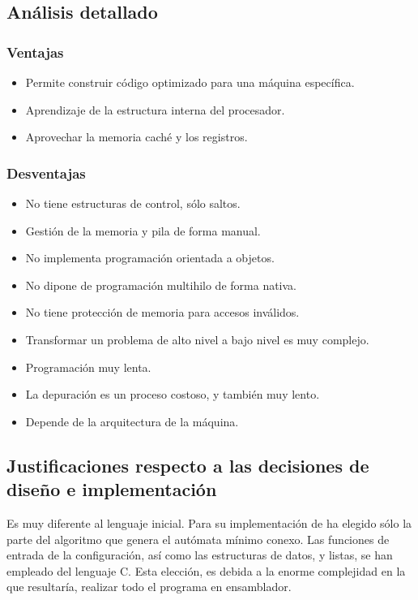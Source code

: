 \documentclass[12pt,a4paper]{article}
\begin{document}
\subsection{Análisis detallado}

\subsubsection{Ventajas}
\begin{itemize}
\item Permite construir código optimizado para una máquina específica.
\item Aprendizaje de la estructura interna del procesador.
\item Aprovechar la memoria caché y los registros.
\end{itemize}

\subsubsection{Desventajas}
\begin{itemize}
\item No tiene estructuras de control, sólo saltos.
\item Gestión de la memoria y pila de forma manual.
\item No implementa programación orientada a objetos.
\item No dipone de programación multihilo de forma nativa.
\item No tiene protección de memoria para accesos inválidos.
\item Transformar un problema de alto nivel a bajo nivel es muy complejo.
\item Programación muy lenta.
\item La depuración es un proceso costoso, y también muy lento.
\item Depende de la arquitectura de la máquina.
\end{itemize}


\subsection{Justificaciones respecto a las decisiones de diseño e 
implementación}
Es muy diferente al lenguaje inicial. Para su implementación de ha elegido sólo 
la parte del algoritmo que genera el autómata mínimo conexo. Las funciones de 
entrada de la configuración, así como las estructuras de datos, y listas, se han 
empleado del lenguaje C. Esta elección, es debida a la enorme complejidad en la 
que resultaría, realizar todo el programa en ensamblador.
\end{document}
